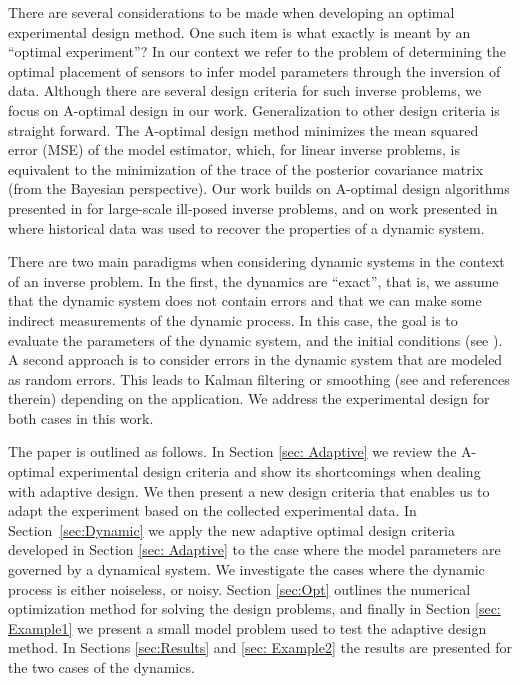 \documentclass[final,leqno,onefignum,onetabnum]{siamltexmm}
\begin{document}
There are several considerations to be made when developing an optimal experimental design method. One such item is what exactly is meant by an ``optimal experiment''? In our context we refer to the problem of determining  the optimal placement of sensors to infer model parameters  through the inversion of  data. 
 Although there are several design criteria for such inverse problems,  we focus on A-optimal design in our work.
 Generalization to other design criteria is straight forward. 
 The A-optimal design method minimizes the mean squared error (MSE) of the model estimator, which, for linear inverse problems, is equivalent to the minimization of  the trace of the posterior covariance matrix (from the Bayesian perspective). Our work  builds on A-optimal design algorithms presented in \cite{Haber2011} for large-scale ill-posed inverse problems, and on work presented in \cite{Fohring2014} where historical data was used
 to recover the properties of a dynamic system. 

There are two main paradigms when considering dynamic systems in the context of an inverse problem. In the
first, the dynamics are ``exact'', that is, we assume that the dynamic system does not contain errors and that we can make some indirect measurements of the dynamic process. In this case,
the goal is to evaluate the parameters of the dynamic system, and the initial conditions (see \cite{Fohring2014}). 
A second approach  is
to consider errors in the dynamic system that are modeled as random errors. This leads to 
Kalman filtering or smoothing (see \cite{kalman1960,Aravkin2010} and references therein) depending on the application.
We address the experimental design for  both cases in this work. 

\bigskip

The paper is outlined as follows. In Section \ref{sec: Adaptive} we review the A-optimal experimental design
criteria and show its shortcomings when dealing with adaptive design.  We then present a new
design criteria that enables us to adapt the experiment based on the collected experimental data.
In Section~\ref{sec:Dynamic} we apply the new adaptive optimal design criteria developed in Section \ref{sec: Adaptive}
to the case where the model parameters are governed by a dynamical system. We investigate the cases where the dynamic process is either noiseless, or noisy. 
Section \ref{sec:Opt}  outlines the numerical optimization method for solving the design problems, and finally in Section \ref{sec: Example1} we present a small model problem used to test the adaptive design method. In Sections \ref{sec:Results} and \ref{sec: Example2} the results are presented for the two cases of the dynamics. 
%
%
%
\end{document}

